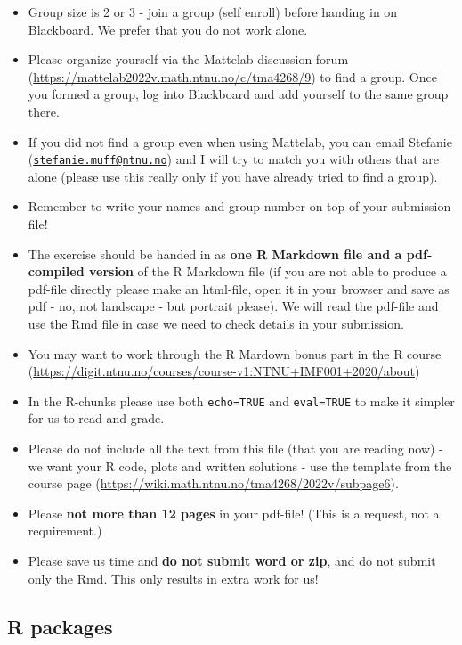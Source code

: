 \documentclass[
]{article}
\providecommand{\tightlist}{%
  \setlength{\itemsep}{0pt}\setlength{\parskip}{0pt}}
\begin{document}
\begin{itemize}
\tightlist
\item
  Group size is 2 or 3 - join a group (self enroll) before handing in on
  Blackboard. We prefer that you do not work alone.
\item
  Please organize yourself via the Mattelab discussion forum
  (\url{https://mattelab2022v.math.ntnu.no/c/tma4268/9}) to find a
  group. Once you formed a group, log into Blackboard and add yourself
  to the same group there.
\item
  If you did not find a group even when using Mattelab, you can email
  Stefanie
  (\href{mailto:stefanie.muff@ntnu.no}{\nolinkurl{stefanie.muff@ntnu.no}})
  and I will try to match you with others that are alone (please use
  this really only if you have already tried to find a group).
\item
  Remember to write your names and group number on top of your
  submission file!
\item
  The exercise should be handed in as \textbf{one R Markdown file and a
  pdf-compiled version} of the R Markdown file (if you are not able to
  produce a pdf-file directly please make an html-file, open it in your
  browser and save as pdf - no, not landscape - but portrait please). We
  will read the pdf-file and use the Rmd file in case we need to check
  details in your submission.
\item
  You may want to work through the R Mardown bonus part in the R course
  (\url{https://digit.ntnu.no/courses/course-v1:NTNU+IMF001+2020/about})
\item
  In the R-chunks please use both \texttt{echo=TRUE} and
  \texttt{eval=TRUE} to make it simpler for us to read and grade.
\item
  Please do not include all the text from this file (that you are
  reading now) - we want your R code, plots and written solutions - use
  the template from the course page
  (\url{https://wiki.math.ntnu.no/tma4268/2022v/subpage6}).
\item
  Please \textbf{not more than 12 pages} in your pdf-file! (This is a
  request, not a requirement.)
\item
  Please save us time and \textbf{do not submit word or zip}, and do not
  submit only the Rmd. This only results in extra work for us!
\end{itemize}

\hypertarget{r-packages}{%
\subsection{R packages}\label{r-packages}}
\end{document}

